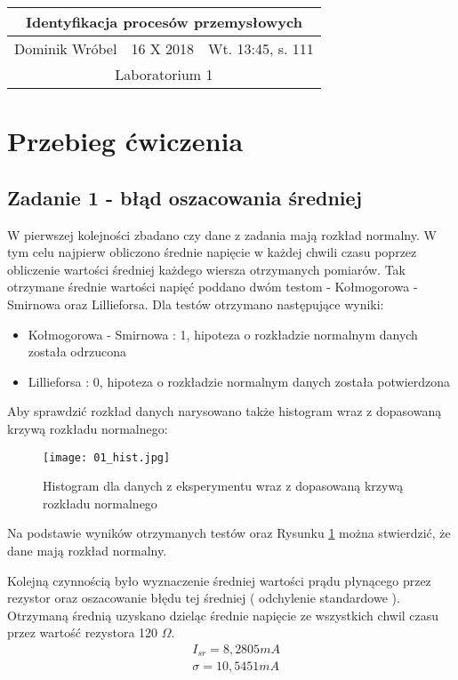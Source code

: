 \documentclass[a4paper,15pt]{article}
\begin{document}

\begin{table}
\begin{center}
\begin{tabular}{|l|l|l|}
\hline
\multicolumn{3}{|c|}{\textbf{Identyfikacja procesów przemysłowych}} \\ \hline Dominik Wróbel & 16 X 2018 & Wt. 13:45, s. 111 \\ \hline
\multicolumn{3}{|c|}{Laboratorium 1} \\ \hline 
\end{tabular}
\end{center}
\end{table}


\section{Przebieg ćwiczenia}
\subsection{Zadanie 1 - błąd oszacowania średniej }

W pierwszej kolejności zbadano czy dane z zadania mają rozkład normalny. W tym celu najpierw obliczono średnie napięcie w każdej chwili czasu poprzez obliczenie wartości średniej każdego wiersza otrzymanych pomiarów. Tak otrzymane średnie wartości napięć poddano dwóm testom - Kołmogorowa - Smirnowa oraz Lillieforsa. Dla testów otrzymano następujące wyniki:
\begin{itemize}
\item Kołmogorowa - Smirnowa : 1, hipoteza o rozkładzie normalnym danych została odrzucona
\item Lillieforsa : 0, hipoteza o rozkładzie normalnym danych została potwierdzona
\end{itemize}

Aby sprawdzić rozkład danych narysowano także histogram wraz z dopasowaną krzywą rozkładu normalnego:

\begin{figure}[H]
\centerline{\texttt{[image: 01\_hist.jpg]}}
\centering
\caption{Histogram dla danych z eksperymentu wraz z dopasowaną krzywą rozkładu normalnego}
\label{fig:01_hist}
\end{figure}

Na podstawie wyników otrzymanych testów oraz Rysunku \ref{fig:01_hist} można stwierdzić, że dane mają rozkład normalny. 

Kolejną czynnością było wyznaczenie średniej wartości prądu płynącego przez rezystor oraz oszacowanie błędu tej średniej ( odchylenie standardowe ). Otrzymaną średnią uzyskano dzieląc średnie napięcie ze wszystkich chwil czasu przez wartość rezystora 120 \( \Omega \). 
\begin{align*}
& I_{sr} = 8,2805 mA \\
& \sigma = 10,5451 mA
\end{align*}
\end{document}

